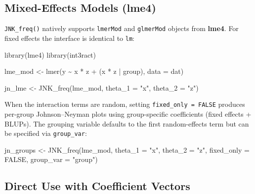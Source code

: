 \documentclass[
  letterpaper,
  DIV=11,
  numbers=noendperiod]{scrartcl}
\newenvironment{Shaded}{\begin{snugshade}}{\end{snugshade}}
\newcommand{\AttributeTok}[1]{\textcolor[rgb]{0.40,0.45,0.13}{#1}}
\newcommand{\ConstantTok}[1]{\textcolor[rgb]{0.56,0.35,0.01}{#1}}
\newcommand{\FunctionTok}[1]{\textcolor[rgb]{0.28,0.35,0.67}{#1}}
\newcommand{\NormalTok}[1]{\textcolor[rgb]{0.00,0.23,0.31}{#1}}
\newcommand{\OtherTok}[1]{\textcolor[rgb]{0.00,0.23,0.31}{#1}}
\newcommand{\SpecialCharTok}[1]{\textcolor[rgb]{0.37,0.37,0.37}{#1}}
\newcommand{\StringTok}[1]{\textcolor[rgb]{0.13,0.47,0.30}{#1}}
\begin{document}
\subsection{\texorpdfstring{Mixed-Effects Models
(\textbf{lme4})}{Mixed-Effects Models (lme4)}}\label{mixed-effects-models-lme4}

\texttt{JNK\_freq()} natively supports \texttt{lmerMod} and
\texttt{glmerMod} objects from \textbf{lme4}. For fixed effects the
interface is identical to \texttt{lm}:

\begin{Shaded}
\begin{Highlighting}[]
\FunctionTok{library}\NormalTok{(lme4)}
\FunctionTok{library}\NormalTok{(int3ract)}

\NormalTok{lme\_mod }\OtherTok{\textless{}{-}} \FunctionTok{lmer}\NormalTok{(y }\SpecialCharTok{\textasciitilde{}}\NormalTok{ x }\SpecialCharTok{*}\NormalTok{ z }\SpecialCharTok{+}\NormalTok{ (x }\SpecialCharTok{*}\NormalTok{ z }\SpecialCharTok{|}\NormalTok{ group), }\AttributeTok{data =}\NormalTok{ dat)}

\NormalTok{jn\_lme }\OtherTok{\textless{}{-}} \FunctionTok{JNK\_freq}\NormalTok{(lme\_mod,}
                   \AttributeTok{theta\_1 =} \StringTok{"x"}\NormalTok{,}
                   \AttributeTok{theta\_2 =} \StringTok{"z"}\NormalTok{)}
\end{Highlighting}
\end{Shaded}

When the interaction terms are random, setting
\texttt{fixed\_only\ =\ FALSE} produces per-group Johnson--Neyman plots
using group-specific coefficients (fixed effects + BLUPs). The grouping
variable defaults to the first random-effects term but can be specified
via \texttt{group\_var}:

\begin{Shaded}
\begin{Highlighting}[]
\NormalTok{jn\_groups }\OtherTok{\textless{}{-}} \FunctionTok{JNK\_freq}\NormalTok{(lme\_mod,}
                      \AttributeTok{theta\_1    =} \StringTok{"x"}\NormalTok{,}
                      \AttributeTok{theta\_2    =} \StringTok{"z"}\NormalTok{,}
                      \AttributeTok{fixed\_only =} \ConstantTok{FALSE}\NormalTok{,}
                      \AttributeTok{group\_var  =} \StringTok{"group"}\NormalTok{)}
\end{Highlighting}
\end{Shaded}

\subsection{Direct Use with Coefficient
Vectors}\label{direct-use-with-coefficient-vectors}
\end{document}
